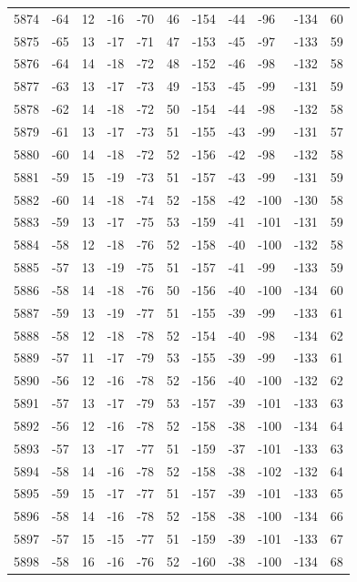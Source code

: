 \begin{table}[H]
\begin{tabular}{lllllllllll}
5874 & -64 & 12 & -16 & -70 & 46 & -154 & -44 & -96 & -134 & 60 \\
5875 & -65 & 13 & -17 & -71 & 47 & -153 & -45 & -97 & -133 & 59 \\
5876 & -64 & 14 & -18 & -72 & 48 & -152 & -46 & -98 & -132 & 58 \\
5877 & -63 & 13 & -17 & -73 & 49 & -153 & -45 & -99 & -131 & 59 \\
5878 & -62 & 14 & -18 & -72 & 50 & -154 & -44 & -98 & -132 & 58 \\
5879 & -61 & 13 & -17 & -73 & 51 & -155 & -43 & -99 & -131 & 57 \\
5880 & -60 & 14 & -18 & -72 & 52 & -156 & -42 & -98 & -132 & 58 \\
5881 & -59 & 15 & -19 & -73 & 51 & -157 & -43 & -99 & -131 & 59 \\
5882 & -60 & 14 & -18 & -74 & 52 & -158 & -42 & -100 & -130 & 58 \\
5883 & -59 & 13 & -17 & -75 & 53 & -159 & -41 & -101 & -131 & 59 \\
5884 & -58 & 12 & -18 & -76 & 52 & -158 & -40 & -100 & -132 & 58 \\
5885 & -57 & 13 & -19 & -75 & 51 & -157 & -41 & -99 & -133 & 59 \\
5886 & -58 & 14 & -18 & -76 & 50 & -156 & -40 & -100 & -134 & 60 \\
5887 & -59 & 13 & -19 & -77 & 51 & -155 & -39 & -99 & -133 & 61 \\
5888 & -58 & 12 & -18 & -78 & 52 & -154 & -40 & -98 & -134 & 62 \\
5889 & -57 & 11 & -17 & -79 & 53 & -155 & -39 & -99 & -133 & 61 \\
5890 & -56 & 12 & -16 & -78 & 52 & -156 & -40 & -100 & -132 & 62 \\
5891 & -57 & 13 & -17 & -79 & 53 & -157 & -39 & -101 & -133 & 63 \\
5892 & -56 & 12 & -16 & -78 & 52 & -158 & -38 & -100 & -134 & 64 \\
5893 & -57 & 13 & -17 & -77 & 51 & -159 & -37 & -101 & -133 & 63 \\
5894 & -58 & 14 & -16 & -78 & 52 & -158 & -38 & -102 & -132 & 64 \\
5895 & -59 & 15 & -17 & -77 & 51 & -157 & -39 & -101 & -133 & 65 \\
5896 & -58 & 14 & -16 & -78 & 52 & -158 & -38 & -100 & -134 & 66 \\
5897 & -57 & 15 & -15 & -77 & 51 & -159 & -39 & -101 & -133 & 67 \\
5898 & -58 & 16 & -16 & -76 & 52 & -160 & -38 & -100 & -134 & 68 \\

\end{tabular}
\end{table}
